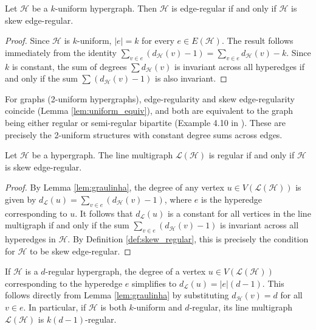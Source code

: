 \documentclass[12pt,reqno]{amsart}
\begin{document}
\begin{lemma}\label{lem:uniform_equiv}
Let $\mathcal{H}$ be a $k$-uniform hypergraph. Then $\mathcal{H}$ is edge-regular if and only if $\mathcal{H}$ is skew edge-regular.
\end{lemma}
\begin{proof}
Since $\mathcal{H}$ is $k$-uniform, $|e| = k$ for every $e \in E(\mathcal{H})$. The result follows immediately from the identity $\sum_{v \in e} (d_{\mathcal{H}}(v) - 1) = \sum_{v \in e} d_{\mathcal{H}}(v) - k$. Since $k$ is constant, the sum of degrees $\sum d_{\mathcal{H}}(v)$ is invariant across all hyperedges if and only if the sum $\sum (d_{\mathcal{H}}(v) - 1)$ is also invariant.
\end{proof}

\begin{example}
For graphs (2-uniform hypergraphs), edge-regularity and skew edge-regularity coincide (Lemma \ref{lem:uniform_equiv}), and both are equivalent to the graph being either regular or semi-regular bipartite (Example 4.10 in \cite{kaue-sign-vector}). These are precisely the 2-uniform structures with constant degree sums across edges.
\end{example}

\begin{theorem}\label{teo:arestareg}
Let $\mathcal{H}$ be a hypergraph. The line multigraph $\mathcal{L}(\mathcal{H})$ is regular if and only if $\mathcal{H}$ is skew edge-regular.
\end{theorem}

\begin{proof}
By Lemma \ref{lem:graulinha}, the degree of any vertex $u \in V(\mathcal{L}(\mathcal{H}))$ is given by $d_{\mathcal{L}}(u) = \sum_{v \in e} (d_{\mathcal{H}}(v) - 1)$, where $e$ is the hyperedge corresponding to $u$. It follows that $d_{\mathcal{L}}(u)$ is a constant for all vertices in the line multigraph if and only if the sum $\sum_{v \in e} (d_{\mathcal{H}}(v) - 1)$ is invariant across all hyperedges in $\mathcal{H}$. By Definition \ref{def:skew_regular}, this is precisely the condition for $\mathcal{H}$ to be skew edge-regular.
\end{proof}

\begin{remark}
If $\mathcal{H}$ is a $d$-regular hypergraph, the degree of a vertex $u \in V(\mathcal{L}(\mathcal{H}))$ corresponding to the hyperedge $e$ simplifies to $d_{\mathcal{L}}(u) = |e|(d-1)$. This follows directly from Lemma \ref{lem:graulinha} by substituting $d_{\mathcal{H}}(v) = d$ for all $v \in e$. In particular, if $\mathcal{H}$ is both $k$-uniform and $d$-regular, its line multigraph $\mathcal{L}(\mathcal{H})$ is $k(d-1)$-regular.
\end{remark}
\end{document}
